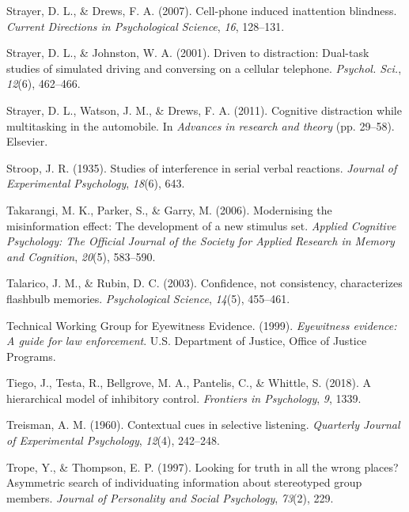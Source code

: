 \documentclass[
]{krantz}
\newlength{\cslhangindent}
\newlength{\cslentryspacingunit} %
\newenvironment{CSLReferences}[2] %
 {%
  \setlength{\parindent}{0pt}
  \ifodd #1
  \let\oldpar\par
  \def\par{\hangindent=\cslhangindent\oldpar}
  \fi
  \setlength{\parskip}{#2\cslentryspacingunit}
 }%
 {}
\begin{document}
\begin{CSLReferences}{1}{0}
\leavevmode{}%
Strayer, D. L., \& Drews, F. A. (2007). Cell-phone induced inattention blindness. \emph{Current Directions in Psychological Science}, \emph{16}, 128--131.

\leavevmode{}%
Strayer, D. L., \& Johnston, W. A. (2001). Driven to distraction: Dual-task studies of simulated driving and conversing on a cellular telephone. \emph{Psychol. Sci.}, \emph{12}(6), 462--466.

\leavevmode{}%
Strayer, D. L., Watson, J. M., \& Drews, F. A. (2011). Cognitive distraction while multitasking in the automobile. In \emph{Advances in research and theory} (pp. 29--58). Elsevier.

\leavevmode{}%
Stroop, J. R. (1935). Studies of interference in serial verbal reactions. \emph{Journal of Experimental Psychology}, \emph{18}(6), 643.

\leavevmode{}%
Takarangi, M. K., Parker, S., \& Garry, M. (2006). Modernising the misinformation effect: The development of a new stimulus set. \emph{Applied Cognitive Psychology: The Official Journal of the Society for Applied Research in Memory and Cognition}, \emph{20}(5), 583--590.

\leavevmode{}%
Talarico, J. M., \& Rubin, D. C. (2003). Confidence, not consistency, characterizes flashbulb memories. \emph{Psychological Science}, \emph{14}(5), 455--461.

\leavevmode{}%
Technical Working Group for Eyewitness Evidence. (1999). \emph{Eyewitness evidence: A guide for law enforcement}. U.S. Department of Justice, Office of Justice Programs.

\leavevmode{}%
Tiego, J., Testa, R., Bellgrove, M. A., Pantelis, C., \& Whittle, S. (2018). A hierarchical model of inhibitory control. \emph{Frontiers in Psychology}, \emph{9}, 1339.

\leavevmode{}%
Treisman, A. M. (1960). Contextual cues in selective listening. \emph{Quarterly Journal of Experimental Psychology}, \emph{12}(4), 242--248.

\leavevmode{}%
Trope, Y., \& Thompson, E. P. (1997). Looking for truth in all the wrong places? Asymmetric search of individuating information about stereotyped group members. \emph{Journal of Personality and Social Psychology}, \emph{73}(2), 229.


\end{CSLReferences}
\end{document}
